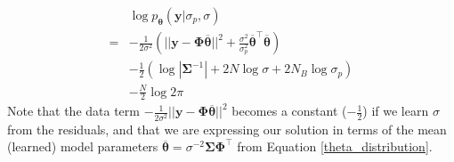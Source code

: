 \documentclass{article}
\begin{document}
\begin{equation}
\label{eq:log_likelihood_BLR}
\begin{split}
    &\log p_{\boldsymbol{\theta}}(\mathbf{y}|\sigma_p, \sigma) \\=&- \frac{1}{2\sigma^2}\left(||\mathbf{y}-\boldsymbol{\Phi}\overline{\boldsymbol{\theta}}||^2 + \frac{\sigma^2}{\sigma_p^2}\overline{\boldsymbol{\theta}}^\top\overline{\boldsymbol{\theta}}\right) \\&-\frac{1}{2}\left( \log|\boldsymbol{\Sigma}^{-1}|+2 N \log \sigma +2N_B \log \sigma_p \right)\\&-\frac{N}{2}\log 2\pi
    \end{split}
\end{equation}Note that the data term $- \frac{1}{2\sigma^2}||\mathbf{y}-\boldsymbol{\Phi}\overline{\boldsymbol{\theta}}||^2 $ becomes a constant ($-\frac{1}{2}$) if we learn $\sigma$ from the residuals, and that we are expressing our solution in terms of the mean (learned) model parameters $\overline{\boldsymbol{\theta}}=\sigma^{-2}\boldsymbol{\Sigma}\boldsymbol{\Phi}^\top$ from Equation \ref{theta_distribution}.
\end{document}
